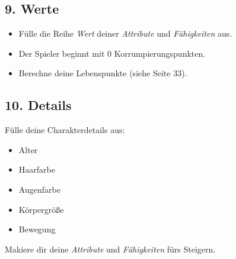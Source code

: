\documentclass[a4paper,10pt,twoside,twocolumn,openany,nodeprecatedcode,bg=print]{dndbook}
\begin{document}
\subsection[]{9. Werte}
\begin{itemize}
  \item Fülle die Reihe \textit{Wert} deiner \textit{Attribute} und \textit{Fähigkeiten} aus.
  \item Der Spieler beginnt mit 0 Korrumpierungspunkten.
  \item Berechne deine Lebenspunkte (siehe Seite 33).
\end{itemize}


\subsection[]{10. Details}
Fülle deine Charakterdetails aus:
\begin{itemize}
  \item Alter
  \item Haarfarbe
  \item Augenfarbe
  \item Körpergröße
  \item Bewegung
\end{itemize}

Makiere dir deine \textit{Attribute} und \textit{Fähigkeiten} fürs Steigern.
\end{document}
